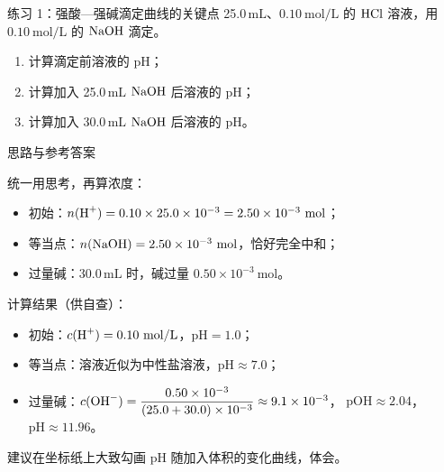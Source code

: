 \documentclass[a4paper,11pt]{ctexart}
\begin{document}
\begin{examplebox}{练习 1：强酸—强碱滴定曲线的关键点}
  25.0\,$\mathrm{mL}$、$0.10\ \mathrm{mol/L}$ 的 $\ce{HCl}$ 溶液，用 $0.10\ \mathrm{mol/L}$ 的 $\ce{NaOH}$ 滴定。
  \begin{enumerate}
    \item 计算滴定前溶液的 pH；
    \item 计算加入 25.0\,$\mathrm{mL}$ $\ce{NaOH}$ 后溶液的 pH；
    \item 计算加入 30.0\,$\mathrm{mL}$ $\ce{NaOH}$ 后溶液的 pH。
  \end{enumerate}

  \begin{proofbox}{思路与参考答案}
    \begin{focuspoints}
      \item 统一用思考，再算浓度：
        \begin{itemize}
          \item 初始：$n(\ce{H^+}) = 0.10 \times 25.0\times 10^{-3} = 2.50\times 10^{-3}\ \mathrm{mol}$；
          \item 等当点：$n(\ce{NaOH}) = 2.50\times 10^{-3}\ \mathrm{mol}$，恰好完全中和；
          \item 过量碱：30.0\,$\mathrm{mL}$ 时，碱过量 $0.50\times 10^{-3}\ \mathrm{mol}$。
        \end{itemize}
      \item 计算结果（供自查）：
        \begin{itemize}
          \item 初始：$c(\ce{H^+}) = 0.10\ \mathrm{mol/L}$，$\mathrm{pH} = 1.0$；
          \item 等当点：溶液近似为中性盐溶液，$\mathrm{pH} \approx 7.0$；
          \item 过量碱：$c(\ce{OH^-}) = \dfrac{0.50\times 10^{-3}}{(25.0 + 30.0)\times 10^{-3}} \approx 9.1\times 10^{-3}$，
          $\mathrm{pOH} \approx 2.04$，$\mathrm{pH} \approx 11.96$。
        \end{itemize}
      \item 建议在坐标纸上大致勾画 pH 随加入体积的变化曲线，体会。
    \end{focuspoints}
  \end{proofbox}
\end{examplebox}
\end{document}
